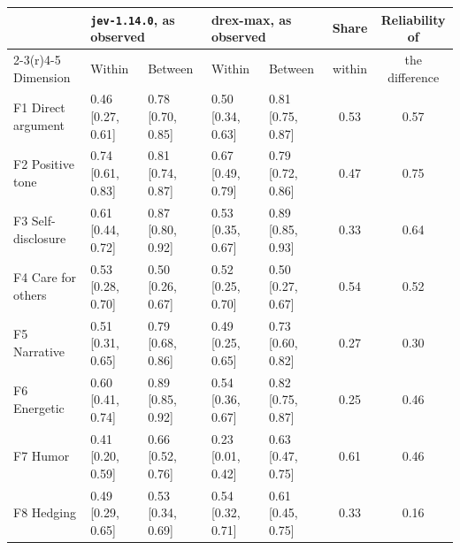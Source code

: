 {\scriptsize\setlength{\tabcolsep}{3.5pt}
\begin{tabular}{@{}l l l l l c c@{}}
\toprule
 & \multicolumn{2}{l}{\texttt{jev-1.14.0}, as observed} & \multicolumn{2}{l}{drex-max, as observed} & Share & Reliability of \\
\cmidrule(r){2-3}\cmidrule(r){4-5}
Dimension & Within & Between & Within & Between & within & the difference \\
\midrule
F1 Direct argument & 0.46 {\scriptsize[0.27, 0.61]} & 0.78 {\scriptsize[0.70, 0.85]} & 0.50 {\scriptsize[0.34, 0.63]} & 0.81 {\scriptsize[0.75, 0.87]} & 0.53 & 0.57 \\
F2 Positive tone & 0.74 {\scriptsize[0.61, 0.83]} & 0.81 {\scriptsize[0.74, 0.87]} & 0.67 {\scriptsize[0.49, 0.79]} & 0.79 {\scriptsize[0.72, 0.86]} & 0.47 & 0.75 \\
F3 Self-disclosure & 0.61 {\scriptsize[0.44, 0.72]} & 0.87 {\scriptsize[0.80, 0.92]} & 0.53 {\scriptsize[0.35, 0.67]} & 0.89 {\scriptsize[0.85, 0.93]} & 0.33 & 0.64 \\
F4 Care for others & 0.53 {\scriptsize[0.28, 0.70]} & 0.50 {\scriptsize[0.26, 0.67]} & 0.52 {\scriptsize[0.25, 0.70]} & 0.50 {\scriptsize[0.27, 0.67]} & 0.54 & 0.52 \\
F5 Narrative & 0.51 {\scriptsize[0.31, 0.65]} & 0.79 {\scriptsize[0.68, 0.86]} & 0.49 {\scriptsize[0.25, 0.65]} & 0.73 {\scriptsize[0.60, 0.82]} & 0.27 & 0.30 \\
F6 Energetic & 0.60 {\scriptsize[0.41, 0.74]} & 0.89 {\scriptsize[0.85, 0.92]} & 0.54 {\scriptsize[0.36, 0.67]} & 0.82 {\scriptsize[0.75, 0.87]} & 0.25 & 0.46 \\
F7 Humor & 0.41 {\scriptsize[0.20, 0.59]} & 0.66 {\scriptsize[0.52, 0.76]} & 0.23 {\scriptsize[0.01, 0.42]} & 0.63 {\scriptsize[0.47, 0.75]} & 0.61 & 0.46 \\
F8 Hedging & 0.49 {\scriptsize[0.29, 0.65]} & 0.53 {\scriptsize[0.34, 0.69]} & 0.54 {\scriptsize[0.32, 0.71]} & 0.61 {\scriptsize[0.45, 0.75]} & 0.33 & 0.16 \\
\bottomrule
\end{tabular}}
